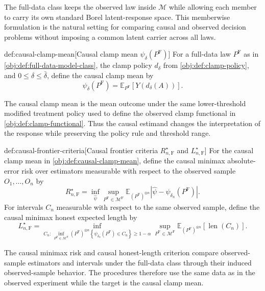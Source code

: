 \documentclass[11pt]{article}
\begin{document}
The full-data class  keeps the observed law inside \(\mathcal M\) while allowing each member to carry its own standard Borel latent-response space. This memberwise formulation is the natural setting for comparing causal and observed decision problems without imposing a common latent carrier across all laws.

\begin{definitionv}{def:causal-clamp-mean}[Causal clamp mean \(\psi_\delta(P^{\mathrm F})\)]
For a full-data law \(P^{\mathrm F}\) as in \cref{obj:def:full-data-model-class}, the clamp policy \(d_\delta\) from \cref{obj:def:clamp-policy}, and \(0\leq\delta\leq\bar\delta\), define the causal clamp mean by
\[
\psi_\delta(P^{\mathrm F})
=
\mathbb E_{P^{\mathrm F}}\!\left[Y(d_\delta(A))\right].
\]
\end{definitionv}

The causal clamp mean  is the mean outcome under the same lower-threshold modified treatment policy used to define the observed clamp functional in \cref{obj:def:clamp-functional}. Thus the causal estimand changes the interpretation of the response while preserving the policy rule and threshold range.

\begin{definitionv}{def:causal-frontier-criteria}[Causal frontier criteria \(R_{n,\mathrm F}^\star\) and \(L_{n,\mathrm F}^\star\)]
For the causal clamp mean in \cref{obj:def:causal-clamp-mean}, define the causal minimax absolute-error risk over estimators measurable with respect to the observed sample \(O_1,\ldots,O_n\) by
\[
 R_{n,\mathrm F}^\star
 =
 \inf_{\widehat\psi}\sup_{P^{\mathrm F}\in\mathcal M^{\mathrm F}}
 \mathbb E_{(P^{\mathrm F})^{\otimes n}}
 \left|\widehat\psi-\psi_{\delta_n}(P^{\mathrm F})\right|.
\]
For intervals \(C_n\) measurable with respect to the same observed sample, define the causal minimax honest expected length by
\[
 L_{n,\mathrm F}^\star
 =
 \inf_{C_n:\,\inf_{P^{\mathrm F}\in\mathcal M^{\mathrm F}}
 (P^{\mathrm F})^{\otimes n}
 \left\{\psi_{\delta_n}(P^{\mathrm F})\in C_n\right\}\geq1-\alpha}
 \sup_{P^{\mathrm F}\in\mathcal M^{\mathrm F}}
 \mathbb E_{(P^{\mathrm F})^{\otimes n}}
 \left[\operatorname{len}(C_n)\right].
\]
\end{definitionv}

The causal minimax risk  and causal honest-length criterion  compare observed-sample estimators and intervals under the full-data class through their induced observed-sample behavior. The procedures therefore use the same data as in the observed experiment while the target is the causal clamp mean.
\end{document}
